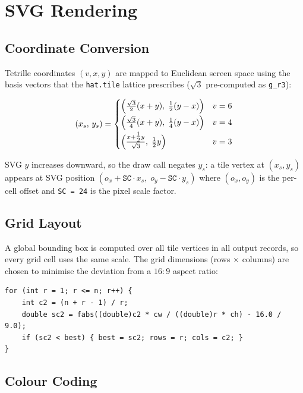 \documentclass[10pt,a4paper]{article}
\let\polysection\section
\renewcommand\section{\needspace{0.16\textheight}\polysection}
\let\polysubsection\subsection
\renewcommand\subsection{\needspace{0.12\textheight}\polysubsection}
\newcommand{\code}[1]{\texttt{\small #1}}
\newcommand{\file}[1]{\texttt{\footnotesize #1}}
\begin{document}
\section{SVG Rendering}

\subsection{Coordinate Conversion}

Tetrille coordinates $(v, x, y)$ are mapped to Euclidean screen space using
the basis vectors that the \file{hat.tile} lattice prescribes
($\sqrt{3}$ pre-computed as \code{g\_r3}):

\[
  (x_s,\, y_s) =
  \begin{cases}
    \Bigl(\tfrac{\sqrt{3}}{2}(x+y),\; \tfrac{1}{2}(y-x)\Bigr) & v = 6 \\[4pt]
    \Bigl(\tfrac{\sqrt{3}}{4}(x+y),\; \tfrac{1}{4}(y-x)\Bigr) & v = 4 \\[4pt]
    \Bigl(\tfrac{x + \tfrac{1}{2}y}{\sqrt{3}},\; \tfrac{1}{2}y\Bigr) & v = 3
  \end{cases}
\]

SVG $y$ increases downward, so the draw call negates $y_s$: a tile vertex
at $(x_s, y_s)$ appears at SVG position
$(o_x + \texttt{SC}\cdot x_s,\; o_y - \texttt{SC}\cdot y_s)$
where $(o_x, o_y)$ is the per-cell offset and \code{SC = 24} is the pixel
scale factor.

\subsection{Grid Layout}

A global bounding box is computed over all tile vertices in all output
records, so every grid cell uses the same scale.  The grid dimensions
(rows $\times$ columns) are chosen to minimise the deviation from a $16:9$
aspect ratio:

\begin{verbatim}
for (int r = 1; r <= n; r++) {
    int c2 = (n + r - 1) / r;
    double sc2 = fabs((double)c2 * cw / ((double)r * ch) - 16.0 / 9.0);
    if (sc2 < best) { best = sc2; rows = r; cols = c2; }
}
\end{verbatim}

\subsection{Colour Coding}
\end{document}
